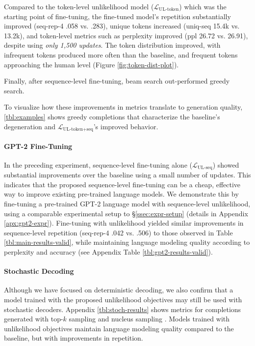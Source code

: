 Compared to the token-level unlikelihood model ($\mathcal{L}_{\text{UL-token}}$) which was the starting point of fine-tuning, the fine-tuned model's repetition substantially improved (seq-rep-4 .058 vs. .283), unique tokens increased (uniq-seq 15.4k vs. 13.2k), and token-level metrics such as perplexity improved (ppl 26.72 vs. 26.91), despite using {\it only 1,500 updates}. The token distribution improved, with infrequent tokens produced more often than the baseline, and frequent tokens approaching the human level (Figure \ref{fig:token-dist-plot}).

Finally, after sequence-level fine-tuning, beam search out-performed greedy search. 

To visualize how these improvements in metrics translate to generation quality, \autoref{tbl:examples} shows greedy completions that characterize the baseline's degeneration and $\mathcal{L}_{\text{UL-token+seq}}$'s improved behavior. 

\paragraph{GPT-2 Fine-Tuning} In the preceding experiment, sequence-level fine-tuning alone ($\mathcal{L}_{\text{UL-seq}}$) showed substantial improvements over the baseline using a small number of updates. This indicates that the proposed sequence-level fine-tuning can be a cheap, effective way to improve existing pre-trained language models. We demonstrate this by fine-tuning a pre-trained GPT-2 \citep{radford2019language} language model with sequence-level unlikelihood, using a comparable experimental setup to \S\ref{ssec:expr-setup} (details in Appendix \ref{apx:gpt2-expr}). Fine-tuning with unlikelihood yielded similar improvements in sequence-level repetition (seq-rep-4 .042 vs. .506) to those observed in Table \ref{tbl:main-results-valid}, while maintaining language modeling quality according to perplexity and accuracy (see Appendix Table \ref{tbl:gpt2-results-valid}).

\paragraph{Stochastic Decoding}

Although we have focused on deterministic decoding, we also confirm that a model trained with the proposed unlikelihood objectives may still be used with stochastic decoders. Appendix \autoref{tbl:stoch-results} shows metrics for completions generated with top-$k$ sampling \citep{fan2018hierarchical} and nucleus sampling \citep{holtzman2019curious}. Models trained with unlikelihood objectives maintain language modeling quality compared to the baseline, but with improvements in repetition.


